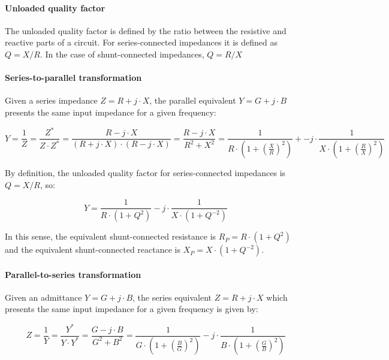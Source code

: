 \paragraph{Unloaded quality factor}
The unloaded quality factor is defined by the ratio between the resistive and reactive parts of a circuit. For series-connected impedances it is defined as $Q = X/R$. In the case of shunt-connected impedances, $Q = R/X$
\paragraph{Series-to-parallel transformation}
Given a series impedance $Z = R + j \cdot X$, the parallel equivalent $Y = G + j \cdot B$ presents the same input impedance for a given frequency:

\begin{equation}
Y = \frac{1}{Z} = \frac{Z^*}{Z \cdot Z^*} = \frac{R - j \cdot X}{(R + j \cdot X) \cdot (R - j \cdot X)} = \frac{R - j \cdot X}{R^2 + X^2} = \frac{1}{R \cdot \left( 1 + \left( \frac{X}{R} \right)^2\right)} +- j \cdot \frac{1}{X \cdot \left( 1 + \left( \frac{R}{X}\right)^2\right)}
\end{equation}

\noindent By definition, the unloaded quality factor for series-connected impedances is $Q = X/R$, so:

\begin{equation}
Y = \frac{1}{R \cdot (1 + Q^2)} - j \cdot \frac{1}{X \cdot (1 + Q^{-2})}
\end{equation}

\noindent In this sense, the equivalent shunt-connected resistance is $R_P = R \cdot (1 + Q^2)$ and the equivalent shunt-connected reactance is $X_P = X \cdot (1 + Q^{-2})$.

\paragraph{Parallel-to-series transformation}
Given an admittance $Y = G + j \cdot B$, the series equivalent $Z = R + j \cdot X$ which presents the same input impedance for a given frequency is given by:

\begin{equation}
Z = \frac{1}{Y} = \frac{Y^*}{Y \cdot Y^*} = \frac{G - j \cdot B}{G^2 + B^2} = \frac{1}{G \cdot \left( 1 + \left( \frac{B}{G} \right)^2\right)} - j \cdot \frac{1}{B \cdot \left( 1 + \left( \frac{G}{B} \right)^2\right)} 
\end{equation}

